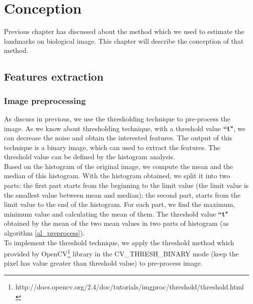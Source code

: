 \chapter{Conception}
Previous chapter has discussed about the method which we used to estimate the landmarks on biological image. This chapter will describe the conception of that method.
\section{Features extraction}
\subsection{Image preprocessing}
As discuss in previous, we use the thresholding technique to pre-process the image. As we know about thresholding technique, with a threshold value \textbf{``t"}, we can decrease the noise and obtain the interested features. The output of this technique is a binary image, which can used to extract the features. The threshold value can be defined by the histogram analysis.\\[0.2cm]
Based on the histogram of the original image, we compute the mean and the median of this histogram. With the histogram obtained, we split it into two parts: the first part starts from the beginning to the limit value (the limit value is the smallest value between mean and median); the second part, starts from the limit value to the end of the histogram. For each part, we find the maximum, minimum value and calculating the mean of them. The threshold value \textbf{``t"} obtained by the mean of the two mean values in two parts of histogram (as algorithm \ref{al_preprocess}).\\
To implement the threshold technique, we apply the threshold method which provided by  OpenCV\footnote{http://docs.opencv.org/2.4/doc/tutorials/imgproc/threshold/threshold.html} library in the CV\_THRESH\_BINARY mode (keep the pixel has value greater than threshold value) to pre-process image.\\
\IncMargin{1em}
